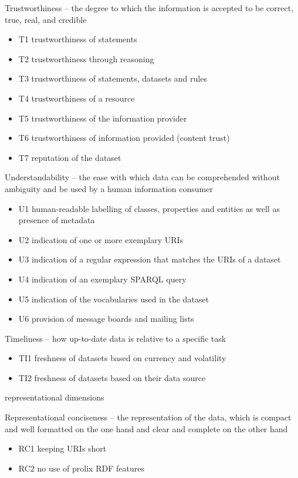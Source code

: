 Trustworthiness -- the degree to which the information is accepted to be correct, true, real, and credible
\begin{itemize}
 \setlength{\parskip}{0pt}
 \setlength{\itemsep}{0pt plus 1pt}
 \item T1 trustworthiness of statements
 \item T2 trustworthiness through reasoning
 \item T3 trustworthiness of statements, datasets and rules
 \item T4 trustworthiness of a resource
 \item T5 trustworthiness of the information provider
 \item T6 trustworthiness of information provided (content trust)
 \item T7 reputation of the dataset
\end{itemize}

Understandability -- the ease with which data can be comprehended without ambiguity and be used by a human information consumer
\begin{itemize}
 \setlength{\parskip}{0pt}
 \setlength{\itemsep}{0pt plus 1pt}
 \item U1 human-readable labelling of classes, properties and entities as well as presence of metadata
 \item U2 indication of one or more exemplary URIs
 \item U3 indication of a regular expression that matches the URIs of a dataset
 \item U4 indication of an exemplary SPARQL query
 \item U5 indication of the vocabularies used in the dataset
 \item U6 provision of message boards and mailing lists
\end{itemize}

Timeliness -- how up-to-date data is relative to a specific task
\begin{itemize}
 \setlength{\parskip}{0pt}
 \setlength{\itemsep}{0pt plus 1pt}
 \item TI1 freshness of datasets based on currency and volatility
 \item TI2 freshness of datasets based on their data source
\end{itemize}

representational dimensions

Representational conciseness -- the representation of the data, which is compact and well formatted on the one hand and clear and complete on the other hand
\begin{itemize}
 \setlength{\parskip}{0pt}
 \setlength{\itemsep}{0pt plus 1pt}
 \item RC1 keeping URIs short
 \item RC2 no use of prolix RDF features
\end{itemize}

